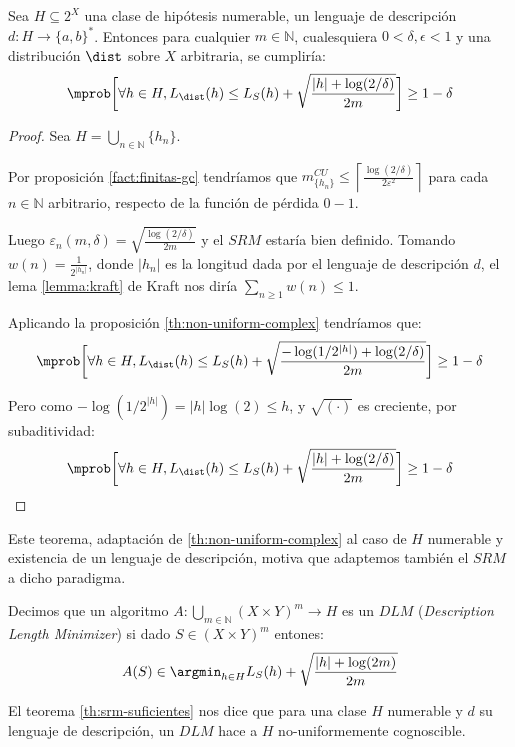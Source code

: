 \begin{fact}
 Sea $H \subseteq 2^X$ una clase de hipótesis numerable, un lenguaje de descripción $d:H \rightarrow \{a,b\}^{\ast}$. Entonces
 para cualquier $m\in \mathbb{N}$, cualesquiera $0 < \delta, \epsilon < 1$ y una distribución $\dist$ sobre $X$ arbitraria, 
 se cumpliría:
 \[
   \mprob\bigg[\forall h\in H, L_{\dist}(h) \le L_S(h) + \sqrt{\frac{|h| + \log(2/\delta)}{2m}} \bigg] \ge 1 - \delta
 \] 
 \label{fact:occam}
\end{fact}
\begin{proof}
 Sea $H = \bigcup_{n\in \mathbb{N}} \{h_n\}$. 
 
 Por proposición \ref{fact:finitas-gc} tendríamos que $m^{CU}_{\{h_n\}} \le \left\lceil \frac{\log(2/\delta)}{2\varepsilon^2} \right\rceil$
 para cada $n\in \mathbb{N}$ arbitrario, respecto de la función de pérdida $0-1$.
 
 Luego $\varepsilon_n(m,\delta) = \sqrt{\frac{\log(2/\delta)}{2m}}$ y el $SRM$ estaría bien definido. Tomando $w(n) = \frac{1}{2^{|h_n|}}$, donde
 $|h_n|$ es la longitud dada por el lenguaje de descripción $d$, el lema \ref{lemma:kraft} de Kraft nos diría 
 $\sum_{n \ge 1} w(n) \le 1$.
 
 Aplicando la proposición \ref{th:non-uniform-complex} tendríamos que:
 \[
   \mprob\bigg[\forall h\in H, L_{\dist}(h) \le L_S(h) + \sqrt{\frac{-\log(1/2^{|h|}) + \log(2/\delta)}{2m}} \bigg] \ge 1 - \delta
 \]
 
 Pero como $-\log(1/2^{|h|}) = |h|\log(2) \le h$, y $\sqrt{(\cdot)}$ es creciente, por subaditividad:
 \[
   \mprob\bigg[\forall h\in H, L_{\dist}(h) \le L_S(h) + \sqrt{\frac{|h| + \log(2/\delta)}{2m}} \bigg] \ge 1 - \delta
 \]
\end{proof}

Este teorema, adaptación de \ref{th:non-uniform-complex} al caso de $H$ numerable y existencia de un lenguaje de descripción,
motiva que adaptemos también el $SRM$ a dicho paradigma.

\begin{definition}
Decimos que un algoritmo $A: \underset{m\in \mathbb{N}}{\bigcup} (X\times Y)^m \rightarrow H$ es un $DLM$ 
(\textit{Description Length Minimizer}) si dado $S \in (X\times Y)^m$ entones:
\[
  A(S) \in \argmin_{h\in H} L_S(h) + \sqrt{\frac{|h| + \log(2m)}{2m}} 
\]
\end{definition}

El teorema \ref{th:srm-suficientes} nos dice que para una clase $H$ numerable y $d$ su lenguaje de descripción, un $DLM$
hace a $H$ no-uniformemente cognoscible.

